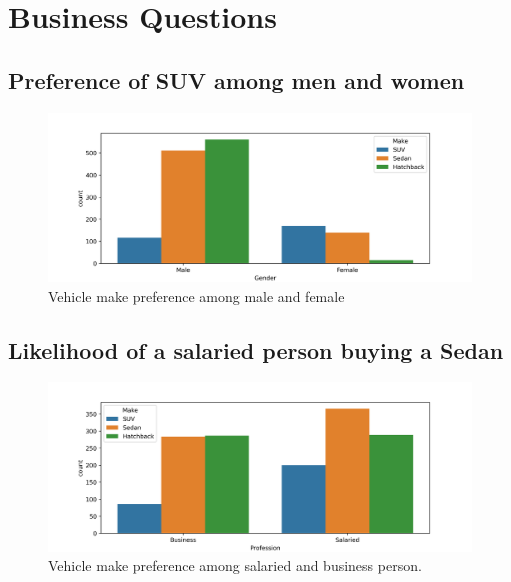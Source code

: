\documentclass[12pt,a4paper]{style}
\begin{document}
    \section{Business Questions}
    \subsection{Preference of SUV among men and women}
		\begin{figure}[h]
			\centering
			\includegraphics[width=13cm]{make_type_gender.png}
			\caption{Vehicle make preference among male and female}
	\end{figure}
	
    \subsection{Likelihood of a salaried person buying a Sedan}
	\begin{figure}[h]
		\centering
		\includegraphics[width=13cm]{make_type_profession.png}
		\caption{Vehicle make preference among salaried and business person.}
	\end{figure}
	
\end{document}
